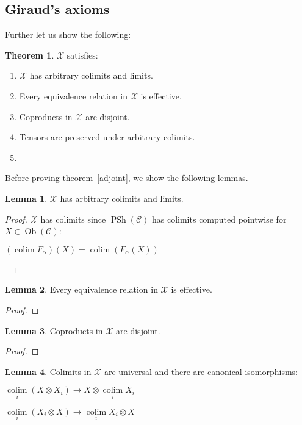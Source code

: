 \documentclass[8pt]{article}
\theoremstyle{definition}
\theoremstyle{definition}
\newtheorem{theorem}{Theorem}[section]
\theoremstyle{definition}
\theoremstyle{definition}
\theoremstyle{definition}
\theoremstyle{definition}
\theoremstyle{definition}
\theoremstyle{definition}
\newtheorem{lemma}{Lemma}[section]
\theoremstyle{definition}
\theoremstyle{definition}
\theoremstyle{definition}
\theoremstyle{definition}
\theoremstyle{definition}
\theoremstyle{question}
\DeclareMathOperator*{\colim}{\operatorname{colim}}
\newcommand{\Ob}[1]{\operatorname{Ob}({\mathcal{#1}})}
\begin{document}
\subsection{Giraud's axioms}

Further let us show the following:
\begin{theorem} $\mathcal{X}$ satisfies:
  \begin{enumerate}
    \item $\mathcal{X}$ has arbitrary colimits and limits.
    \item Every equivalence relation in $\mathcal{X}$ is effective.
    \item Coproducts in $\mathcal{X}$ are disjoint.
    \item Tensors are preserved under arbitrary colimits.
    \item 
  \end{enumerate}
\end{theorem}

Before proving theorem~\ref{adjoint}, we show the following lemmas.

\begin{lemma}
  $\mathcal{X}$ has arbitrary colimits and limits.
\end{lemma}

\begin{proof}
$\mathcal{X}$ has colimits since $\operatorname{PSh}(\mathcal{C})$ has colimits computed pointwise for $X \in \Ob{C}$:
\begin{center}
  $(\colim F_{\alpha})(X) = \colim (F_{\alpha}(X))$
\end{center}
\end{proof}

\begin{lemma}
  Every equivalence relation in $\mathcal{X}$ is effective.
\end{lemma}

\begin{proof}

\end{proof}

\begin{lemma}
  Coproducts in $\mathcal{X}$ are disjoint.
\end{lemma}

\begin{proof}

\end{proof}

\begin{lemma}
  Colimits in $\mathcal{X}$ are universal and there are canonical isomorphisms:
  \begin{center}
  $\colim \limits_i (X \otimes X_i) \to X \otimes \colim \limits_i X_i$

  $\colim \limits_i (X_i \otimes X) \to \colim \limits_i X_i \otimes X$
  \end{center}
\end{lemma}
\end{document}

